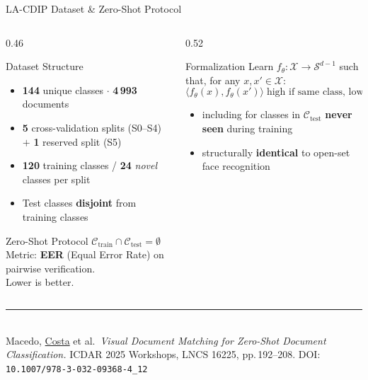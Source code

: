 \documentclass[aspectratio=169,10pt]{beamer}
\begin{document}
\begin{frame}{LA-CDIP Dataset \& Zero-Shot Protocol}

  \begin{columns}[T]
    \begin{column}{0.46\linewidth}
      \begin{block}{Dataset Structure}
        \footnotesize
        \begin{itemize}\setlength\itemsep{2pt}
          \item \textbf{144} unique classes $\cdot$ \textbf{4\,993} documents
          \item \textbf{5} cross-validation splits (S0--S4) $+$ \textbf{1} reserved split (S5)
          \item \textbf{120} training classes / \textbf{24} \textit{novel} classes per split
          \item Test classes \textbf{disjoint} from training classes
        \end{itemize}
      \end{block}
      \vspace{4pt}
      \begin{alertblock}{Zero-Shot Protocol}
        \footnotesize
        $\mathcal{C}_{\text{train}} \cap \mathcal{C}_{\text{test}} = \emptyset$\\[2pt]
        Metric: \textbf{EER} (Equal Error Rate) on pairwise verification.\\
        Lower is better.
      \end{alertblock}
    \end{column}

    \begin{column}{0.52\linewidth}
      \begin{block}{Formalization}
        \small
        Learn $f_\theta: \mathcal{X} \to \mathcal{S}^{d-1}$ such that, for
        any $x, x' \in \mathcal{X}$:
        \[
          \langle f_\theta(x), f_\theta(x')\rangle \;\text{high if same class, low otherwise}
        \]
        \vspace{-4pt}
        \begin{itemize}\setlength\itemsep{2pt}\footnotesize
          \item[\textbf{$\to$}] including for classes in $\mathcal{C}_{\text{test}}$ \textbf{never seen} during training
          \item[\textbf{$\to$}] structurally \textbf{identical} to open-set face recognition
        \end{itemize}
      \end{block}
    \end{column}
  \end{columns}

  \vspace{6pt}
  \noindent\rule{\linewidth}{0.3pt}\\[-2pt]
  {\tiny\color{black!50}
  Macedo, \underline{Costa} et al.\ \textit{Visual Document Matching for Zero-Shot Document Classification.}
  ICDAR 2025 Workshops, LNCS 16225, pp.\,192--208.
  DOI:\,\texttt{10.1007/978-3-032-09368-4\_12}}

\end{frame}
\end{document}
